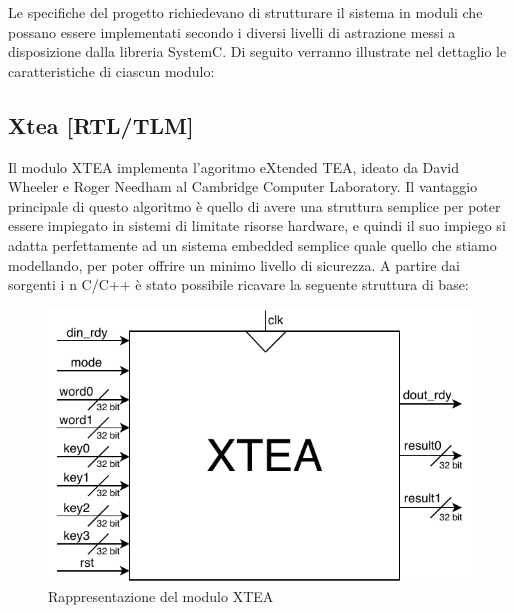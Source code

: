 \documentclass[]{IEEEtran}
\begin{document}
Le specifiche del progetto richiedevano di strutturare il sistema in moduli che possano essere implementati secondo i 
diversi livelli di astrazione messi a disposizione dalla libreria SystemC. Di seguito verranno illustrate nel dettaglio 
le caratteristiche di ciascun modulo:

\subsection{Xtea [RTL/TLM]}
Il modulo XTEA implementa l'agoritmo eXtended TEA, ideato da David Wheeler e Roger Needham al Cambridge Computer 
Laboratory. Il vantaggio principale di questo algoritmo \`e quello di avere una struttura semplice per poter essere 
impiegato in sistemi di limitate risorse hardware, e quindi il suo impiego si adatta perfettamente ad un sistema embedded
semplice quale quello che stiamo modellando, per poter offrire un minimo livello di sicurezza. A partire dai sorgenti i
n C/C++ \`e stato possibile ricavare la seguente struttura di base: 
\begin{figure}[h]
    \centering
    \includegraphics[width=0.7\columnwidth]{figures/xtea.pdf}
	\caption{Rappresentazione del modulo XTEA}
    \label{fig:xtea}
\end{figure}
\end{document}
